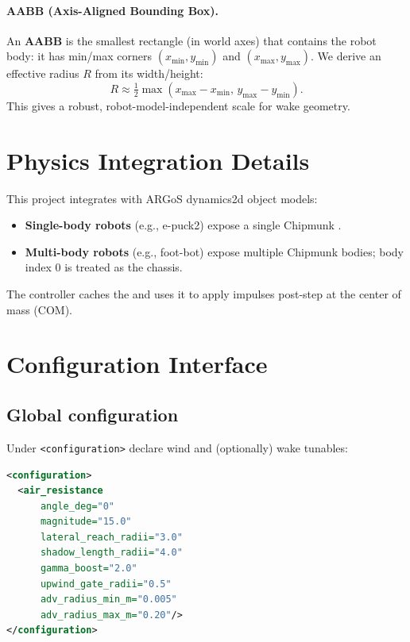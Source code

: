 \documentclass[11pt,a4paper]{article}
\newcommand{\codeid}[1]{\texttt{\seqsplit{#1}}} %
\begin{document}
\paragraph{AABB (Axis-Aligned Bounding Box).}
An \textbf{AABB} is the smallest rectangle (in world axes) that contains the robot body: it has min/max corners \((x_{\min},y_{\min})\)
and \((x_{\max},y_{\max})\). We derive an effective radius \(R\) from its width/height:
\[
R \approx \tfrac{1}{2}\max(x_{\max}-x_{\min},\,y_{\max}-y_{\min}).
\]
This gives a robust, robot-model-independent scale for wake geometry.

\section{Physics Integration Details}
This project integrates with ARGoS dynamics2d object models:
\begin{itemize}
  \item \textbf{Single-body robots} (e.g., e-puck2) expose a single Chipmunk \codeid{cpBody}.
  \item \textbf{Multi-body robots} (e.g., foot-bot) expose multiple Chipmunk bodies; body index 0 is treated as the chassis.
\end{itemize}
The controller caches the \codeid{cpBody*} and uses it to apply impulses post-step at the center of mass (COM).

\section{Configuration Interface}
\subsection{Global configuration}
Under \verb|<configuration>| declare wind and (optionally) wake tunables:
\begin{lstlisting}[language=XML]
<configuration>
  <air_resistance
      angle_deg="0"
      magnitude="15.0"
      lateral_reach_radii="3.0"
      shadow_length_radii="4.0"
      gamma_boost="2.0"
      upwind_gate_radii="0.5"
      adv_radius_min_m="0.005"
      adv_radius_max_m="0.20"/>
</configuration>
\end{lstlisting}
\end{document}
